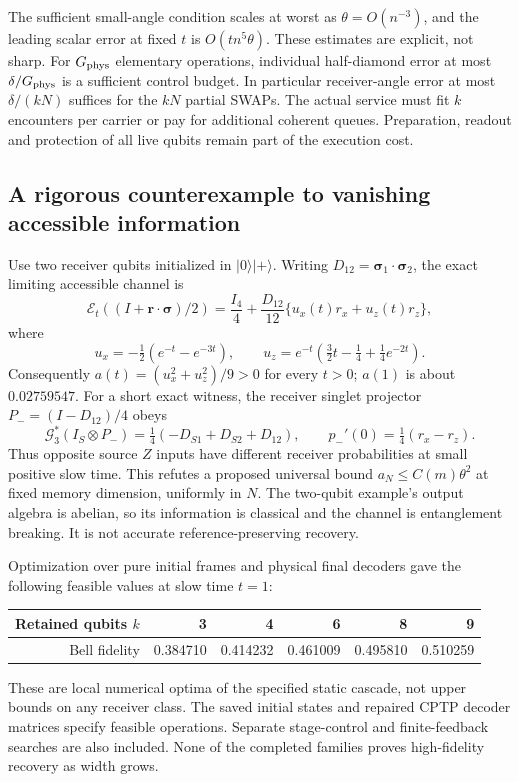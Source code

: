 The sufficient small-angle condition scales at worst as $\theta=O(n^{-3})$,
and the leading scalar error at fixed $t$ is $O(tn^5\theta)$. These estimates
are explicit, not sharp. For $G_{\rm phys}$ elementary operations, individual
half-diamond error at most $\delta/G_{\rm phys}$ is a sufficient control
budget. In particular receiver-angle error at most $\delta/(kN)$ suffices
for the $kN$ partial SWAPs. The actual service must fit $k$ encounters per
carrier or pay for additional coherent queues. Preparation, readout and
protection of all live qubits remain part of the execution cost.

\subsection{A rigorous counterexample to vanishing accessible information}
\label{sec:framesignal}
Use two receiver qubits initialized in $|0\rangle|+\rangle$. Writing
$D_{12}=\boldsymbol\sigma_1\cdot\boldsymbol\sigma_2$, the exact limiting
accessible channel is
\[
 \mathcal E_t((I+\mathbf r\cdot\boldsymbol\sigma)/2)
 =\frac{I_4}{4}+\frac{D_{12}}{12}
 \{u_x(t)r_x+u_z(t)r_z\},
\]
where
\[
 u_x=-\tfrac12(e^{-t}-e^{-3t}),\qquad
 u_z=e^{-t}\left(\tfrac32t-\tfrac14+\tfrac14e^{-2t}\right).
\]
Consequently $a(t)=(u_x^2+u_z^2)/9>0$ for every $t>0$; $a(1)$ is about
$0.02759547$. For a short exact witness, the receiver singlet projector
$P_-=(I-D_{12})/4$ obeys
\[
 \mathcal G_3^*(I_S\otimes P_-)
 =\tfrac14(-D_{S1}+D_{S2}+D_{12}),\qquad
 p_-'(0)=\tfrac14(r_x-r_z).
\]
Thus opposite source $Z$ inputs have different receiver probabilities at
small positive slow time. This refutes a proposed universal bound
$a_N\le C(m)\theta^2$ at fixed memory dimension, uniformly in $N$.
The two-qubit example's output algebra is abelian, so its information is
classical and the channel is entanglement breaking. It is not accurate
reference-preserving recovery.

Optimization over pure initial frames and physical final decoders gave the
following feasible values at slow time $t=1$:
\begin{center}
\begin{tabular}{rrrrrr}
\toprule
Retained qubits $k$ & 3 & 4 & 6 & 8 & 9\\\midrule
Bell fidelity & 0.384710 & 0.414232 & 0.461009 & 0.495810 & 0.510259\\
\bottomrule
\end{tabular}
\end{center}
These are local numerical optima of the specified static cascade, not
upper bounds on any receiver class. The saved initial states and repaired
CPTP decoder matrices specify feasible operations. Separate stage-control
and finite-feedback searches are also included. None of the completed
families proves high-fidelity recovery as width grows.

